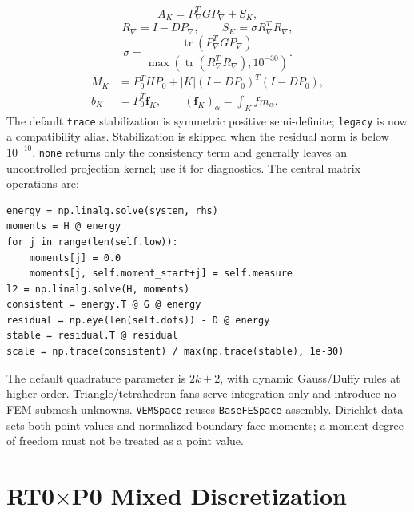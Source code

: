 \documentclass[11pt,oneside]{book}
\theoremstyle{definition}
\theoremstyle{plain}
\newcommand{\code}[1]{\texttt{#1}}
\begin{document}
\begin{equation}
A_K=P_\nabla^TGP_\nabla+S_K,
\label{eq:vem-split}
\end{equation}
\begin{equation}
R_\nabla=I-DP_\nabla,\qquad S_K=\sigma R_\nabla^TR_\nabla,
\label{eq:vem-stab}
\end{equation}
\begin{equation}
\sigma=\frac{\operatorname{tr}(P_\nabla^TGP_\nabla)}
{\max(\operatorname{tr}(R_\nabla^TR_\nabla),10^{-30})}.
\label{eq:vem-sigma}
\end{equation}
\begin{equation}
\begin{split}
M_K&=P_0^THP_0+|K|(I-DP_0)^T(I-DP_0),\\
b_K&=P_0^T\mathbf f_K,\qquad
(\mathbf f_K)_\alpha=\int_K f m_\alpha.
\end{split}
\label{eq:vem-load}
\end{equation}
The default \code{trace} stabilization is symmetric positive semi-definite;
\code{legacy} is now a compatibility alias. Stabilization is skipped when the
residual norm is below $10^{-10}$. \code{none} returns only the consistency term and
generally leaves an uncontrolled projection kernel; use it for diagnostics.
The central matrix operations are:

\begin{lstlisting}[language=MosicaFE,caption={Core local projection and stabilization operations}]
energy = np.linalg.solve(system, rhs)
moments = H @ energy
for j in range(len(self.low)):
    moments[j] = 0.0
    moments[j, self.moment_start+j] = self.measure
l2 = np.linalg.solve(H, moments)
consistent = energy.T @ G @ energy
residual = np.eye(len(self.dofs)) - D @ energy
stable = residual.T @ residual
scale = np.trace(consistent) / max(np.trace(stable), 1e-30)
\end{lstlisting}

The default quadrature parameter is $2k+2$, with dynamic Gauss/Duffy rules at
higher order. Triangle/tetrahedron fans serve integration only and introduce no FEM
submesh unknowns. \code{VEMSpace} reuses \code{BaseFESpace} assembly. Dirichlet data
sets both point values and normalized boundary-face moments; a moment degree of
freedom must not be treated as a point value.

\section{RT0\texorpdfstring{$\times$}{x}P0 Mixed Discretization}
\end{document}
